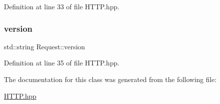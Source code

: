 Definition at line 33 of file H\+T\+T\+P.\+hpp.

\mbox{\label{class_request_a736c2c715b9392706662727a4a353172}} 
\subsubsection{\texorpdfstring{version}{version}}
{\footnotesize\ttfamily std\+::string Request\+::version}



Definition at line 35 of file H\+T\+T\+P.\+hpp.



The documentation for this class was generated from the following file\+:\begin{DoxyCompactItemize}
\item 
\hyperlink{_h_t_t_p_8hpp}{H\+T\+T\+P.\+hpp}\end{DoxyCompactItemize}
